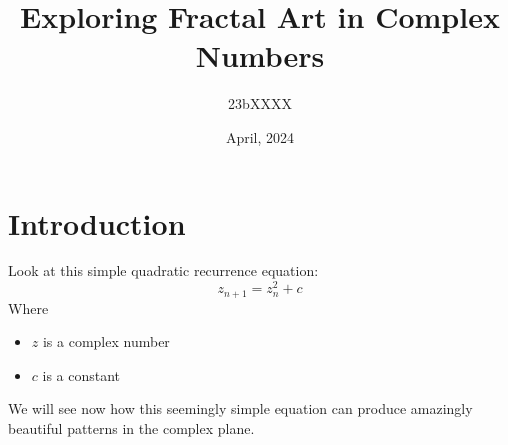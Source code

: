 \documentclass{article}
\title{Exploring Fractal Art in Complex Numbers}
\author{23bXXXX}
\date{April, 2024}
\begin{document}
\maketitle
\section{Introduction}
Look at this simple quadratic recurrence equation:
\begin{equation}
    z_{n+1} = z_{n}^{2} + c
    \label{eq:eqn}
\end{equation}
Where
\begin{itemize}
    \item $z$ is a complex number
    \item $c$ is a constant
\end{itemize}
We will see now how this seemingly simple equation can produce amazingly beautiful patterns in the complex plane.

\end{document}
